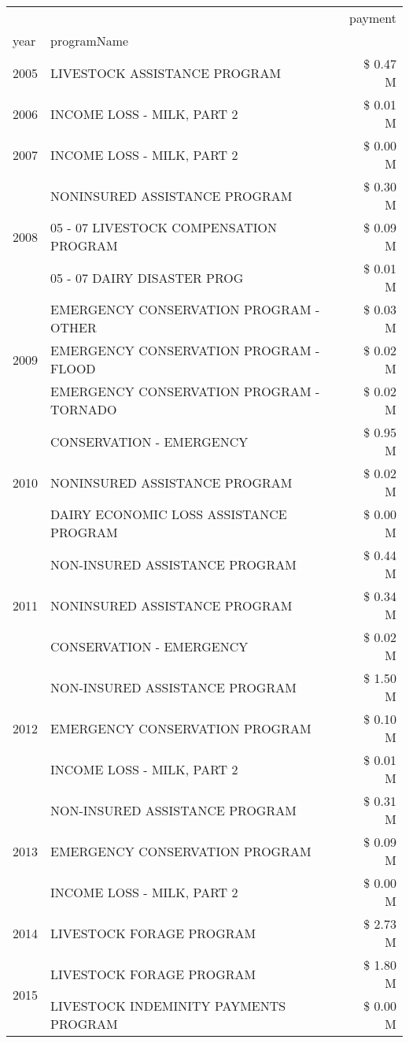 \begin{tabular}{llr}
\toprule
 &  & payment \\
year & programName &  \\
\midrule
2005 & LIVESTOCK ASSISTANCE PROGRAM & \$ 0.47 M \\
\cline{1-3}
2006 & INCOME LOSS - MILK, PART 2 & \$ 0.01 M \\
\cline{1-3}
2007 & INCOME LOSS - MILK, PART 2 & \$ 0.00 M \\
\cline{1-3}
\multirow[t]{3}{*}{2008} & NONINSURED ASSISTANCE PROGRAM & \$ 0.30 M \\
 & 05 - 07 LIVESTOCK COMPENSATION PROGRAM & \$ 0.09 M \\
 & 05 - 07 DAIRY DISASTER PROG & \$ 0.01 M \\
\cline{1-3}
\multirow[t]{3}{*}{2009} & EMERGENCY CONSERVATION PROGRAM - OTHER & \$ 0.03 M \\
 & EMERGENCY CONSERVATION PROGRAM - FLOOD & \$ 0.02 M \\
 & EMERGENCY CONSERVATION PROGRAM - TORNADO & \$ 0.02 M \\
\cline{1-3}
\multirow[t]{3}{*}{2010} & CONSERVATION - EMERGENCY & \$ 0.95 M \\
 & NONINSURED ASSISTANCE PROGRAM & \$ 0.02 M \\
 & DAIRY ECONOMIC LOSS ASSISTANCE PROGRAM & \$ 0.00 M \\
\cline{1-3}
\multirow[t]{3}{*}{2011} & NON-INSURED ASSISTANCE PROGRAM & \$ 0.44 M \\
 & NONINSURED ASSISTANCE PROGRAM & \$ 0.34 M \\
 & CONSERVATION - EMERGENCY & \$ 0.02 M \\
\cline{1-3}
\multirow[t]{3}{*}{2012} & NON-INSURED ASSISTANCE PROGRAM & \$ 1.50 M \\
 & EMERGENCY CONSERVATION PROGRAM & \$ 0.10 M \\
 & INCOME LOSS - MILK, PART 2 & \$ 0.01 M \\
\cline{1-3}
\multirow[t]{3}{*}{2013} & NON-INSURED ASSISTANCE PROGRAM & \$ 0.31 M \\
 & EMERGENCY CONSERVATION PROGRAM & \$ 0.09 M \\
 & INCOME LOSS - MILK, PART 2 & \$ 0.00 M \\
\cline{1-3}
2014 & LIVESTOCK FORAGE PROGRAM & \$ 2.73 M \\
\cline{1-3}
\multirow[t]{3}{*}{2015} & LIVESTOCK FORAGE PROGRAM & \$ 1.80 M \\
 & LIVESTOCK INDEMINITY PAYMENTS PROGRAM & \$ 0.00 M \\

\end{tabular}
